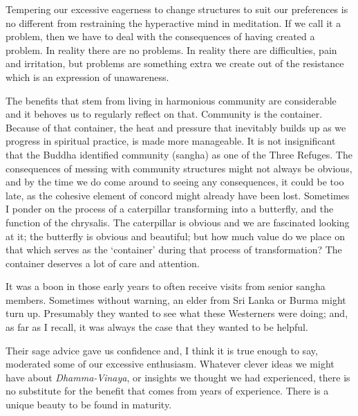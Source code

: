 Tempering our excessive eagerness to change structures to suit our
preferences is no different from restraining the hyperactive mind in
meditation. If we call it a problem, then we have to deal with the
consequences of having created a problem. In reality there are no
problems. In reality there are difficulties, pain and irritation, but
problems are something extra we create out of the resistance which is an
expression of unawareness.

The benefits that stem from living in harmonious community are
considerable and it behoves us to regularly reflect on that. Community
is the container. Because of that container, the heat and pressure that
inevitably builds up as we progress in spiritual practice, is made more
manageable. It is not insignificant that the Buddha identified community
(sangha) as one of the Three Refuges. The consequences of messing with
community structures might not always be obvious, and by the time we do
come around to seeing any consequences, it could be too late, as the
cohesive element of concord might already have been lost. Sometimes I
ponder on the process of a caterpillar transforming into a butterfly,
and the function of the chrysalis. The caterpillar is obvious and we are
fascinated looking at it; the butterfly is obvious and beautiful; but
how much value do we place on that which serves as the `container'
during that process of transformation? The container deserves a lot of
care and attention.

It was a boon in those early years to often receive visits from senior
sangha members. Sometimes without warning, an elder from Sri Lanka or
Burma might turn up. Presumably they wanted to see what these Westerners
were doing; and, as far as I recall, it was always the case that they
wanted to be helpful.

Their sage advice gave us confidence and, I think it is true enough to
say, moderated some of our excessive enthusiasm. Whatever clever ideas
we might have about \emph{Dhamma-Vinaya}, or insights we thought we had
experienced, there is no substitute for the benefit that comes from
years of experience. There is a unique beauty to be found in maturity.

